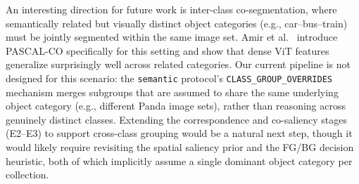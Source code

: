 An interesting direction for future work is inter-class co-segmentation, where semantically related but visually distinct object categories (e.g., car--bus--train) must be jointly segmented within the same image set. Amir et al.~\cite{amir2022deepvit} introduce PASCAL-CO specifically for this setting and show that dense ViT features generalize surprisingly well across related categories. Our current pipeline is not designed for this scenario: the \texttt{semantic} protocol's \texttt{CLASS\_GROUP\_OVERRIDES} mechanism merges subgroups that are assumed to share the same underlying object category (e.g., different Panda image sets), rather than reasoning across genuinely distinct classes. Extending the correspondence and co-saliency stages (E2--E3) to support cross-class grouping would be a natural next step, though it would likely require revisiting the spatial saliency prior and the FG/BG decision heuristic, both of which implicitly assume a single dominant object category per collection.